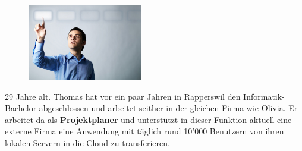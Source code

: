 \begin{description}
\begin{minipage}[t]{0.35\textwidth}
\begin{figure}[H]
						\includegraphics[trim=0cm 0cm 0cm 0cm, clip=true, width=5cm]{requirements/media/img/thomasBucher.jpg}
						\caption[Symbolbild Persona Thomas Bucher\newline
						]
						{\label{Thomas Bucher}}
					\end{figure}
				\end{minipage}
				\begin{minipage}[t]{0.55\textwidth}
					29 Jahre alt.
					Thomas hat vor ein paar Jahren in Rapperswil den Informatik-Bachelor abgeschlossen und arbeitet seither in der gleichen Firma wie Olivia.
					Er arbeitet da als \textbf{Projektplaner} und unterstützt in dieser Funktion aktuell eine externe Firma eine Anwendung mit täglich rund 10'000 Benutzern von ihren lokalen Servern in die Cloud zu transferieren.
				\end{minipage}
		\end{description}
		
